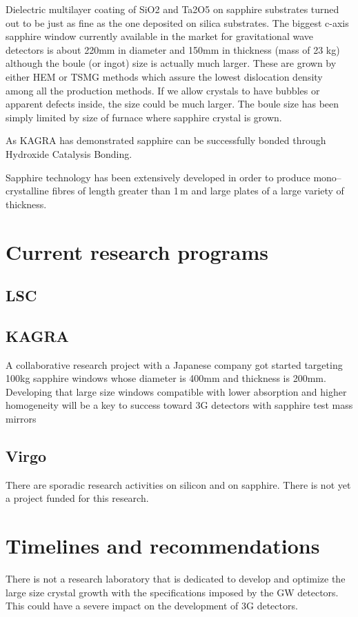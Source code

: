 Dielectric multilayer coating of SiO2 and Ta2O5 on sapphire substrates turned out to be just as fine as the one deposited on silica substrates. 
The biggest c-axis sapphire window currently available in the market for gravitational wave detectors is about 220mm in diameter and 150mm in thickness (mass of 23 kg) although the boule (or ingot) size is actually much larger. These are grown by either HEM or TSMG methods which assure the lowest dislocation density among all the production methods. If we allow crystals to have bubbles or apparent defects inside, the size could be much larger. The boule size has been simply limited by size of furnace where sapphire crystal is grown.

As KAGRA has demonstrated sapphire can be successfully bonded through Hydroxide Catalysis Bonding. 

Sapphire technology has been extensively developed in order to produce mono--crystalline fibres of length greater than 1\,m and large plates of a large variety of thickness. 

\section{Current research programs}
\subsection{LSC}

\subsection{KAGRA}
A collaborative research project with a Japanese company got started targeting 100kg sapphire windows whose diameter is 400mm and thickness is 200mm. Developing that large size windows compatible with lower absorption and higher homogeneity will be a key to success toward 3G detectors with sapphire test mass mirrors
\subsection{Virgo}
There are sporadic research activities on silicon and on sapphire. There is not yet a project funded for this research.

\section{Timelines and recommendations} 
There is not a research laboratory that is dedicated to develop and optimize the large size crystal growth with the specifications imposed by the GW detectors. This could have a severe impact on the development of 3G detectors.